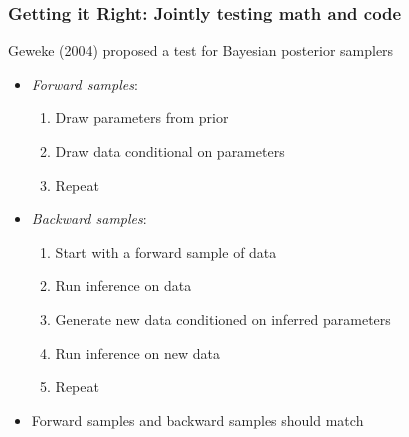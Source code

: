 \documentclass[10pt, xcolor=table]{beamer}
\theoremstyle{definition}
\theoremstyle{remark}
\begin{document}
\begin{frame} \frametitle{Getting it Right: Jointly testing math and code}

Geweke (2004) proposed a test for Bayesian posterior samplers \vspace{.2cm}
\begin{itemize}
\item {\em Forward samples}: 
\begin{enumerate}
\item Draw parameters from prior
\item Draw data conditional on parameters
\item Repeat
\end{enumerate} \vspace{.2cm}
\item {\em Backward samples}: 
\begin{enumerate}
\item Start with a forward sample of data
\item Run inference on data
\item Generate new data conditioned on inferred parameters
\item Run inference on new data
\item Repeat
\end{enumerate} \vspace{.2cm}
\item Forward samples and backward samples should match
\end{itemize}


\end{frame}
\end{document}
